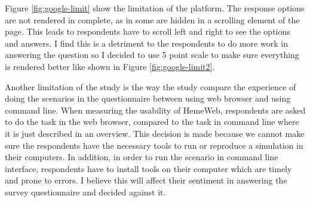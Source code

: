 \vspace{1cm}
\noindent%
\begin{minipage}{\linewidth}%
 \label{fig:google-limit2}%
\end{minipage}

\vspace{1cm}


Figure \ref{fig:google-limit} show the limitation of the platform. The response options are not rendered in complete, as in some are hidden in a scrolling element of the page. This leads to respondents have to scroll left and right to see the options and answers. I find this is a detriment to the respondents to do more work in answering the question so I decided to use 5 point scale to make sure everything is rendered better like shown in Figure \ref{fig:google-limit2}.


Another limitation of the study is the way the study compare the experience of doing the scenarios in the questionnaire between using web browser and using command line.  When measuring the usability of HemeWeb, respondents are asked to do the task in the web browser, compared to the task in command line where it is just described in an overview. This decision is made because we cannot make sure the respondents have the necessary tools to run or reproduce a simulation in their computers.  In addition, in order to run the scenario in command line interface, respondents have to install tools on their computer which are timely and prone to errors. I believe this will affect their sentiment in answering the survey questionnaire and decided against it.


